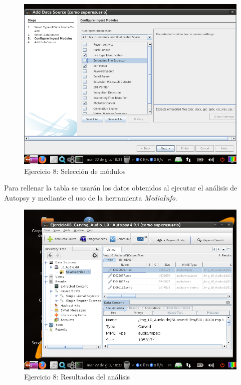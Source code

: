 \documentclass[11pt]{article}
\begin{document}
\begin{figure}[H]
    \caption{Ejercicio 8: Selección de módulos}
    \centering
    \includegraphics[scale=0.7]{p03/e8-4.png}
\end{figure}

Para rellenar la tabla se usarán los datos obtenidos al ejecutar el análisis de Autopsy y mediante el uso de la herramienta \textit{MediaInfo}.

\begin{figure}[H]
    \caption{Ejercicio 8: Resultados del análisis}
    \centering
    \includegraphics[scale=0.7]{p03/e8-5.png}
\end{figure}
\end{document}
